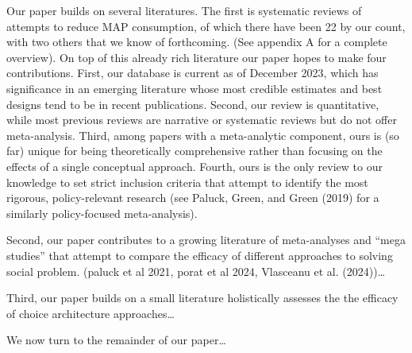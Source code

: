 \documentclass[
  man]{apa6}
\begin{document}
Our paper builds on several literatures. The first is systematic reviews of attempts to reduce MAP consumption, of which there have been 22 by our count, with two others that we know of forthcoming. (See appendix A for a complete overview). On top of this already rich literature our paper hopes to make four contributions. First, our database is current as of December 2023, which has significance in an emerging literature whose most credible estimates and best designs tend to be in recent publications. Second, our review is quantitative, while most previous reviews are narrative or systematic reviews but do not offer meta-analysis. Third, among papers with a meta-analytic component, ours is (so far) unique for being theoretically comprehensive rather than focusing on the effects of a single conceptual approach. Fourth, ours is the only review to our knowledge to set strict inclusion criteria that attempt to identify the most rigorous, policy-relevant research (see Paluck, Green, and Green (2019) for a similarly policy-focused meta-analysis).

Second, our paper contributes to a growing literature of meta-analyses and ``mega studies'' that attempt to compare the efficacy of different approaches to solving social problem. (paluck et al 2021, porat et al 2024, Vlasceanu et al. (2024))\ldots{}

Third, our paper builds on a small literature holistically assesses the the efficacy of choice architecture approaches\ldots{}

We now turn to the remainder of our paper\ldots{}
\end{document}

